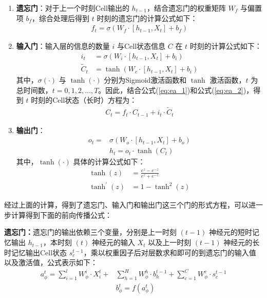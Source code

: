 \begin{enumerate}
    \item \textbf{遗忘门}：对于上一个时刻Cell输出的 $h_{t-1}$，结合遗忘门的权重矩阵 $W_f$ 与偏置项 $b_f$，综合处理后得到 $t$ 时刻的遗忘门的计算公式如下：
    \begin{align}
        f_t=\sigma(W_f\cdot[h_{t-1},X_t]+b_f)
    \end{align}

    \item \textbf{输入门}：输入层的信息的数量 $i$ 与Cell状态信息 $C$ 在 $t$ 时刻的计算公式如下：
    \begin{align}
        i_t &= \sigma(W_i\cdot[h_{t-1},X_t]+b_i) \label{eq:ea_1}\\
        \widetilde{C}_t &= \tanh(W_c\cdot[h_{t-1},X_t]+b_i) \label{eq:ea_2}
    \end{align}
    其中，$\sigma(\cdot)$ 与 $\tanh(\cdot)$ 分别为Sigmoid激活函数和 $\tanh$ 激活函数，$t$ 为总时间数，$t=0,1,2,\dots,T$。因此，结合公式(\ref{eq:ea_1})和公式(\ref{eq:ea_2})，得到 $t$ 时刻的Cell状态（长时）方程为：
    \begin{align}
        C_t=f_t\cdot C_{t-1}+i_t\cdot\widetilde{C}_t
    \end{align}

    \item \textbf{输出门}：
    \begin{align}
        o_t = &\sigma(W_o\cdot[h_{t-1},X_t]+b_o) \\
        &h_t = o_t\cdot\tanh(C_t)   \label{eq:ea_01}
    \end{align}
    其中，$\tanh(\cdot)$ 具体的计算公式如下：
    \begin{align}
        \tanh(z) &= \frac{e^z-e^{-z}}{e^z+e^{-z}} \\
        \tanh^{\prime}(z) &= 1-\tanh^2(z)
    \end{align}
\end{enumerate}
经过上面的计算，得到了遗忘门、输入门和输出门这三个门的形式方程，可以进一步计算得到下面的前向传播公式：

\textbf{遗忘门：}遗忘门的输出依赖三个变量，分别是上一时刻 $(t-1)$ 神经元的短时记忆输出 $h_{t-1}$，本时刻 $(t)$ 神经元的输入 $X_t$ 以及上一时刻 $(t-1)$ 神经元的长时记忆输出Cell状态 $s^{t-1}_{c}$，乘以权重因子后对层数求和即可的到遗忘门的输入值以及激活值，公式表示如下：
\begin{align}
    a_\phi^t = \sum_{i=1}^lW^{i}_{\phi} \cdot X_i^t+&\sum_{h=1}^HW^{h}_{\phi} \cdot b_h^{t-1}+\sum_{c=1}^CW^{c}_{\phi} \cdot s_c^{t-1} \label{eq:ea_3}\\
    &b_\phi^t = f(a_\phi^t) \label{eq:ea_4}
\end{align}

